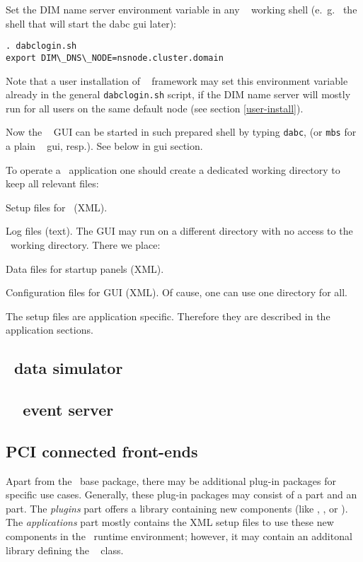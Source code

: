 \item Set the DIM name server environment variable in any \dabc~ working shell (e.~g.~
the shell that will start the dabc gui later):
\begin{verbatim}
. dabclogin.sh
export DIM\_DNS\_NODE=nsnode.cluster.domain
\end{verbatim} 
Note that a user installation of \dabc~ framework may set this 
environment variable already in the general {\tt dabclogin.sh} script, if the DIM name server will 
mostly run for all users on the same default node (see section \ref{user-install}).  

\item Now the \dabc~ GUI can be started in such prepared shell by typing {\tt dabc}, (or 
{\tt mbs} for a plain \mbs~ gui, resp.). See below in gui section.  

\enum


To operate a \dabc\ application one should create a dedicated 
working directory to keep all relevant files:
\bbul
\item Setup files for \dabc\ (XML).
\item Log files (text).
\ebul
The GUI may run on a different directory with no access to the \dabc\ working directory.
There we place:
\bbul
\item Data files for startup panels (XML).
\item Configuration files for GUI (XML).
\ebul
Of cause, one can use one directory for all.

The setup files are application specific. Therefore they are described in
the application sections.
\subsection[DABC data simulator]{\dabc\ data simulator}
\subsection[DABC MBS event server]{\dabc\ \mbs\ event server}
\subsection{PCI connected front-ends}


Apart from the \dabc\ base package, there may be additional plug-in packages for
specific use cases. Generally, these plug-in packages may consist of a
 part and an  part.
The {\em plugins} part offers a library
containing new components (like , 
, or ). The {\em applications} part
mostly contains the XML setup files to use these new components in the
\dabc\ runtime environment; however, it 
may contain an additonal library defining the \dabc\ 
class.

